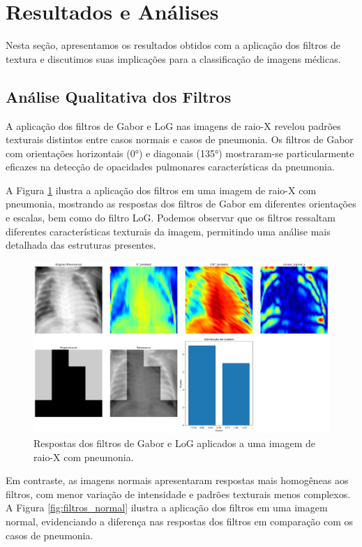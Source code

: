 \documentclass[sigconf,nonacm]{acmart}
\begin{document}
\section{Resultados e Análises}

Nesta seção, apresentamos os resultados obtidos com a aplicação dos filtros de textura e discutimos suas implicações para a classificação de imagens médicas.

\subsection{Análise Qualitativa dos Filtros}

A aplicação dos filtros de Gabor e LoG nas imagens de raio-X revelou padrões texturais distintos entre casos normais e casos de pneumonia. Os filtros de Gabor com orientações horizontais (0°) e diagonais (135°) mostraram-se particularmente eficazes na detecção de opacidades pulmonares características da pneumonia.

A Figura \ref{fig:filtros_pneumonia} ilustra a aplicação dos filtros em uma imagem de raio-X com pneumonia, mostrando as respostas dos filtros de Gabor em diferentes orientações e escalas, bem como do filtro LoG. Podemos observar que os filtros ressaltam diferentes características texturais da imagem, permitindo uma análise mais detalhada das estruturas presentes.
\begin{figure}[h]
  \centering
  \includegraphics[width=1\linewidth]{../images/global_0_pneu.png}
  \caption{Respostas dos filtros de Gabor e LoG aplicados a uma imagem de raio-X com pneumonia.}
  \label{fig:filtros_pneumonia}
\end{figure}

Em contraste, as imagens normais apresentaram respostas mais homogêneas aos filtros, com menor variação de intensidade e padrões texturais menos complexos. A Figura \ref{fig:filtros_normal} ilustra a aplicação dos filtros em uma imagem normal, evidenciando a diferença nas respostas dos filtros em comparação com os casos de pneumonia.
\end{document}
